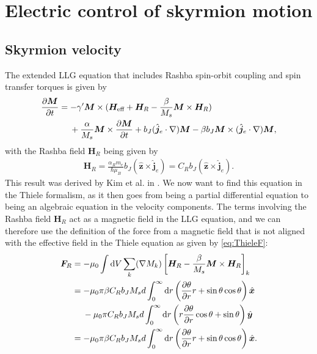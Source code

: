 \documentclass[12pt, a4paper, twoside, openright]{report}
\renewcommand{\d}[1]{\ensuremath{\operatorname{d}\!{#1}}}
\numberwithin{equation}{chapter}
\numberwithin{figure}{chapter}
\numberwithin{table}{chapter}
\begin{document}
\chapter{Electric control of skyrmion motion}
\section{Skyrmion velocity}
The extended LLG equation that includes Rashba spin-orbit coupling and spin transfer torques is given by
\begin{align}
\nonumber \frac{\partial \mathbold{M}}{\partial t} &= -\gamma'\mathbold{M}\times(\mathbold{H}_{\text{eff}}+\mathbold{H}_R-\frac{\beta}{M_s} \mathbold{M}\times\mathbold{H}_R) \\
&\hspace{4.5mm}+\frac{\alpha}{M_s}\mathbold{M}\times\frac{\partial\mathbold{M}}{\partial t} + b_J (\mathbold{\hat{j}}_e\cdot\mathbold{\nabla})\mathbold{M} - \beta b_J \mathbold{M}\times(\mathbold{\hat{j}}_e\cdot\mathbold{\nabla})\mathbold{M}, 
\end{align}
with the Rashba field $\mathbold{H}_R$ being given by
\begin{align}
\mathbold{H}_R = \frac{\alpha_R m_e}{\hbar \mu_B}b_J (\mathbold{\hat{z}}\times\mathbold{\hat{j}}_e) = C_R b_J (\mathbold{\hat{z}}\times\mathbold{\hat{j}}_e).
\end{align}
This result was derived by Kim et al. in \cite{Kim2012}. We now want to find this equation in the Thiele formalism, as it then goes from being a partial differential equation to being an algebraic equation in the velocity components. The terms involving the Rashba field $\mathbold{H}_R$ act as a magnetic field in the LLG equation, and we can therefore use the definition of the force from a magnetic field that is not aligned with the effective field in the Thiele equation as given by \eqref{eq:ThieleF}:
\begin{align}
\nonumber\mathbold{F}_R &= -\mu_0\int \d V\sum_k (\mathbold{\nabla}M_k)\left[\mathbold{H}_R - \frac{\beta}{M_s}\mathbold{M}\times\mathbold{H}_R\right]_k \\
\nonumber&= -\mu_0 \pi\beta C_R b_J M_s d \int_0^{\infty} \d r \left(\frac{\partial \theta}{\partial r} r + \sin\theta\cos\theta \right) \mathbold{\hat{x}} \\
\nonumber&\hspace{4.5mm}- \mu_0 \pi C_R b_J M_s d \int_0^{\infty} \d r \left(r\frac{\partial \theta}{\partial r}\cos\theta + \sin\theta\right) \mathbold{\hat{y}} \\
&= -\mu_0 \pi\beta C_R b_J M_s d \int_0^{\infty} \d r \left(\frac{\partial \theta}{\partial r} r + \sin\theta\cos\theta \right) \mathbold{\hat{x}}.
\end{align}
\end{document}

